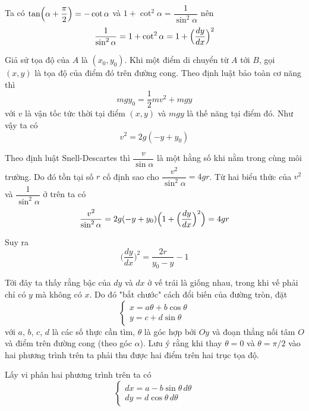 \documentclass{mynotes}
\begin{document}
Ta có $\tan \Bigl( \alpha + \dfrac{\pi}{2} \Bigr) = -\cot \alpha$ và $1 + \cot^2 \alpha = \dfrac{1}{\sin^2 \alpha}$ nên 
\begin{equation}
    \dfrac{1}{\sin^2 \alpha} = 1 + \cot^2 \alpha = 1 + \Bigl(\dfrac{dy}{dx}\Bigl)^2
\end{equation}

Giả sử tọa độ của $A$ là $(x_0, y_0)$. Khi một điểm di chuyển từ $A$ tới $B$, gọi $(x, y)$ là tọa độ của điểm đó trên đường cong. Theo định luật bảo toàn cơ năng thì 
\begin{equation*}
    m g y_0 = \frac{1}{2} m v^2 + m g y
\end{equation*}
với $v$ là vận tốc tức thời tại điểm $(x, y)$ và $mgy$ là thế năng tại điểm đó. Như vậy ta có 
\begin{equation}
    v^2 = 2 g (-y + y_0)
\end{equation}

Theo định luật Snell-Descartes thì $\dfrac{v}{\sin \alpha}$ là một hằng số khi nằm trong cùng môi trường. Do đó tồn tại số $r$ cố định sao cho $\dfrac{v^2}{\sin^2 \alpha} = 4 g r$. Từ hai biểu thức của $v^2$ và $\dfrac{1}{\sin^2 \alpha}$ ở trên ta có
\begin{equation}
    \frac{v^2}{\sin^2 \alpha} = 2 g (-y + y_0) \Bigl( 1 + \Bigl(\frac{dy}{dx}\Bigr)^2 \Bigr) = 4 g r
\end{equation}

Suy ra
\begin{equation}
    \Big(\frac{dy}{dx}\Big)^2 = \frac{2 r}{y_0 - y} - 1
    \label{diff:eq1}
\end{equation}

Tới đây ta thấy rằng bậc của $dy$ và $dx$ ở vế trái là giống nhau, trong khi vế phải chỉ có $y$ mà không có $x$. Do đó "bắt chước" cách đổi biến của đường tròn, đặt
\begin{equation*}
    \begin{cases}
        x = a \theta + b \cos \theta \\
        y = c + d \sin \theta
    \end{cases}
\end{equation*}
với $a$, $b$, $c$, $d$ là các số thực cần tìm, $\theta$ là góc hợp bởi $Oy$ và đoạn thẳng nối tâm $O$ và điểm trên đường cong (theo góc $\alpha$). Lưu ý rằng khi thay $\theta = 0$ và $\theta = \pi / 2$ vào hai phương trình trên ta phải thu được hai điểm trên hai trục tọa độ.

Lấy vi phân hai phương trình trên ta có
\begin{equation*}
    \begin{cases}
    dx = a - b \sin \theta \, d \theta \\ dy = d \cos \theta \, d \theta
\end{cases}
\end{equation*}
\end{document}
